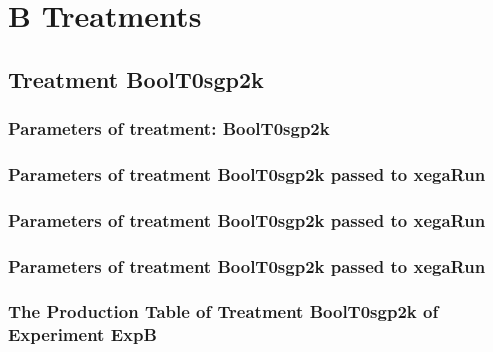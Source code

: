 \documentclass[18pt,c]{beamer}
\makeatletter
\def\beamer@writeslidentry@miniframesoff{%
  \expandafter\beamer@ifempty\expandafter{\beamer@framestartpage}{}%
  {%
   \clearpage\beamer@notesactions%
  }
}
\newcommand*{\miniframesoff}{\let\beamer@writeslidentry=\beamer@writeslidentry@miniframesoff}
\makeatother
\begin{document}
\miniframesoff
\section{B Treatments}
\miniframesoff
\subsection{Treatment BoolT0sgp2k}

 \begin{frame}
 \fontsize{8pt}{9pt}\selectfont
 \frametitle{  Parameters of treatment: BoolT0sgp2k 
 }

 \label{ExpBtParmTable000.tex}  
 \end{frame}


 \begin{frame}
 \fontsize{8pt}{9pt}\selectfont
 \frametitle{  Parameters of treatment BoolT0sgp2k passed to xegaRun
 }

 \label{ExpBtParmTable001.tex}  
 \end{frame}


 \begin{frame}
 \fontsize{8pt}{9pt}\selectfont
 \frametitle{  Parameters of treatment BoolT0sgp2k passed to xegaRun
 }

 \label{ExpBtParmTable002.tex}  
 \end{frame}


 \begin{frame}
 \fontsize{8pt}{9pt}\selectfont
 \frametitle{  Parameters of treatment BoolT0sgp2k passed to xegaRun
 }

 \label{ExpBtParmTable003.tex}  
 \end{frame}

 \begin{frame}
 \fontsize{8pt}{9pt}\selectfont
 \frametitle{ The Production Table of Treatment BoolT0sgp2k of Experiment ExpB }

 \label{ExpBGrammarTable000.tex}  
 \end{frame}
\end{document}
